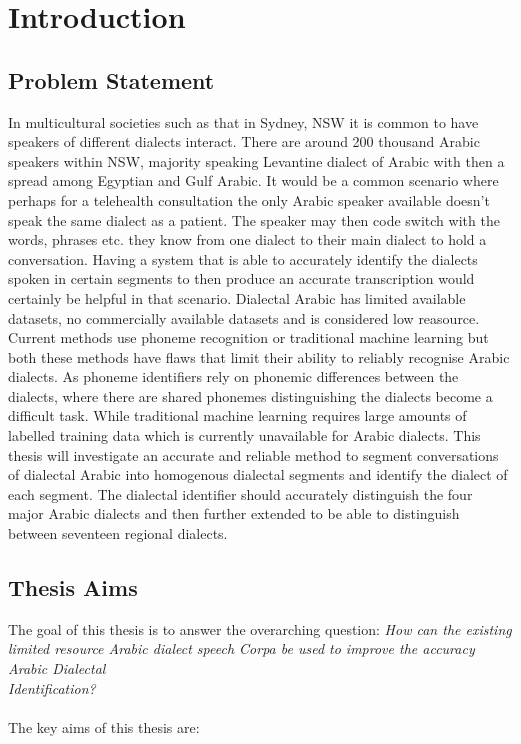 \chapter{Introduction}\label{ch:intro}
\section{Problem Statement}\label{sec:problem}
In multicultural societies such as that in Sydney, NSW it is common to have speakers of different dialects interact. 
There are around 200 thousand Arabic speakers within NSW, majority speaking Levantine dialect of Arabic with then a spread among Egyptian and Gulf Arabic.
It would be a common scenario where perhaps for a telehealth consultation
the only Arabic speaker available doesn't speak the same dialect as a patient.
The speaker may then code switch with the words, phrases etc. they know from one dialect to their main dialect to hold a conversation. 
Having a system that is able to accurately identify the dialects spoken in certain segments to then produce an accurate transcription would certainly be helpful in that scenario. 
Dialectal Arabic has limited available datasets, no commercially available datasets and is considered low reasource. Current methods use phoneme recognition or 
traditional machine learning but both these methods have flaws that limit their ability to reliably recognise Arabic dialects. 
As phoneme identifiers rely on phonemic differences between the dialects, where there are shared phonemes distinguishing the dialects become a difficult task.
While traditional machine learning requires large amounts of labelled training data which is currently unavailable for Arabic dialects.  
This thesis will investigate an accurate and reliable method to segment conversations of dialectal Arabic into
homogenous dialectal segments and identify the dialect of each segment.
The dialectal identifier should accurately distinguish the four major Arabic 
dialects and then further extended to be able to distinguish between seventeen regional dialects. 




\section{Thesis Aims}
The goal of this thesis is to answer the overarching question:\emph{
How can the existing limited resource Arabic dialect speech Corpa be used to improve the accuracy
Arabic Dialectal \\Identification? }\\
\\The key aims of this thesis are: 


